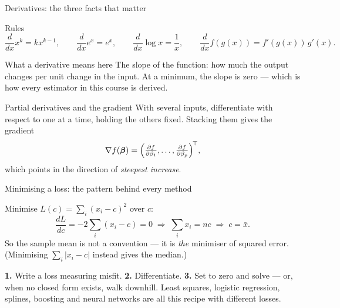 \documentclass[aspectratio=169,11pt]{beamer}
\begin{document}
\begin{frame}{Derivatives: the three facts that matter}
  \footnotesize
  \begin{block}{Rules}
    \[
      \frac{d}{dx}x^k = kx^{k-1},
      \qquad
      \frac{d}{dx}e^x = e^x,
      \qquad
      \frac{d}{dx}\log x = \frac1x,
      \qquad
      \frac{d}{dx}f(g(x)) = f'(g(x))\,g'(x).
    \]
  \end{block}
  \begin{block}{What a derivative means here}
    The slope of the function: how much the output changes per unit change
    in the input. At a minimum, the slope is zero --- which is how every
    estimator in this course is derived.
  \end{block}
  \begin{block}{Partial derivatives and the gradient}
    With several inputs, differentiate with respect to one at a time,
    holding the others fixed. Stacking them gives the gradient
    \[
      \nabla f(\boldsymbol\beta)
      = \Bigl(\tfrac{\partial f}{\partial \beta_1}, \dots,
              \tfrac{\partial f}{\partial \beta_p}\Bigr)^{\!\top},
    \]
    which points in the direction of \emph{steepest increase}.
  \end{block}
\end{frame}

\begin{frame}{Minimising a loss: the pattern behind every method}
  \begin{numexample}
    Minimise $L(c) = \sum_i (x_i - c)^2$ over $c$:
    \[
      \frac{dL}{dc} = -2\sum_i (x_i - c) = 0
      \;\Longrightarrow\;
      \sum_i x_i = nc
      \;\Longrightarrow\;
      c = \bar x .
    \]
    So the sample mean is not a convention --- it is \emph{the} minimiser of
    squared error. (Minimising $\sum_i |x_i - c|$ instead gives the median.)
  \end{numexample}
  \begin{takeaway}
    \textbf{1.} Write a loss measuring misfit. \textbf{2.} Differentiate.
    \textbf{3.} Set to zero and solve --- or, when no closed form exists,
    walk downhill. Least squares, logistic regression, splines, boosting and
    neural networks are all this recipe with different losses.
  \end{takeaway}
\end{frame}
\end{document}
